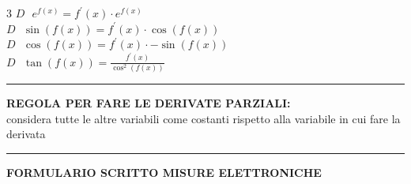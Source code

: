 \documentclass{article}
\begin{document}
\begin{multicols*}{3}
    $D \text{ } e^{f(x)} = f^{'} (x) \cdot e^{f(x)} $ \\
    $D  \text{ } \sin(f(x)) = f^{'} (x) \cdot \cos(f(x)) $ \\
    $D  \text{ } \cos(f(x)) = f^{'} (x) \cdot - \sin(f(x)) $ \\
    $D  \text{ } \tan(f(x)) = \frac{f^{'} (x)}{\cos^{2} (f(x))}$ \newline
    \hrule 
    \textbf{REGOLA PER FARE LE DERIVATE PARZIALI:} \\
    considera tutte le altre variabili come costanti rispetto alla variabile in cui fare la derivata \newline 
    \hrule 
    \textbf{FORMULARIO SCRITTO MISURE ELETTRONICHE } \newline
\end{multicols*}
\end{document}
